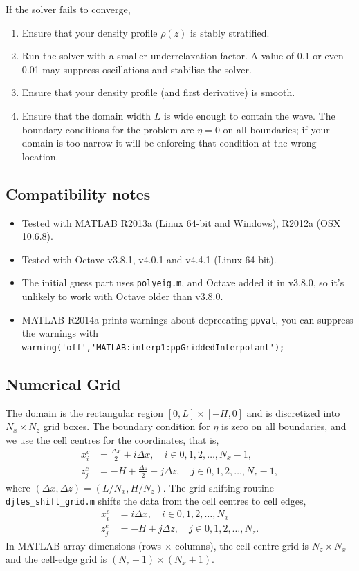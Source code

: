 \documentclass[letterpaper]{article}
\begin{document}
If the solver fails to converge, 
\begin{enumerate}
 \item Ensure that your density profile $\rho(z)$ is stably stratified.
 \item Run the solver with a smaller underrelaxation factor. A value of 0.1 or even 0.01 may suppress oscillations and stabilise the solver. 
 \item Ensure that your density profile (and first derivative) is smooth.
 \item Ensure that the domain width $L$ is wide enough to contain the wave. The boundary conditions for the problem are $\eta=0$ on all boundaries; if your domain is too narrow it will be enforcing that condition at the wrong location.
\end{enumerate}

\subsection{Compatibility notes}
\begin{itemize}
 \item Tested with MATLAB R2013a (Linux 64-bit and Windows), R2012a (OSX 10.6.8).
 \item Tested with Octave v3.8.1, v4.0.1 and v4.4.1 (Linux 64-bit).
 \item The initial guess part uses \verb+polyeig.m+, and Octave added it in v3.8.0, so it's unlikely to work with Octave older than v3.8.0.
 \item MATLAB R2014a prints warnings about deprecating \verb+ppval+, you can suppress the warnings with \\ \verb+warning('off','MATLAB:interp1:ppGriddedInterpolant');+
\end{itemize}

\subsection{Numerical Grid}
The domain is the rectangular region $[0,L] \times [-H,0]$ and is discretized into $N_x\times N_z$ grid boxes. The boundary condition for $\eta$ is zero on all boundaries, and we use the cell centres for the coordinates, that is,
\begin{align}
x_i^c &= \frac{\Delta x}{2} + i \Delta x, \quad i \in 0,1,2,\ldots,N_x-1,\\
z_j^c &= -H + \frac{\Delta z}{2} + j \Delta z, \quad j \in 0,1,2,\ldots,N_z-1,
\end{align}
where $(\Delta x, \Delta z) = (L/N_x, H/N_z)$. The grid shifting routine \verb+djles_shift_grid.m+ shifts the data from the cell centres to cell edges, 
\begin{align}
x_i^e &= i \Delta x, \quad i \in 0,1,2,\ldots,N_x\\
z_j^e &= -H + j \Delta z, \quad j  \in 0,1,2,\ldots,N_z.
\end{align}
In MATLAB array dimensions (rows $\times$ columns), the cell-centre grid is $N_z \times N_x$ and the cell-edge grid is $(N_z+1) \times (N_x+1)$.
\end{document}
